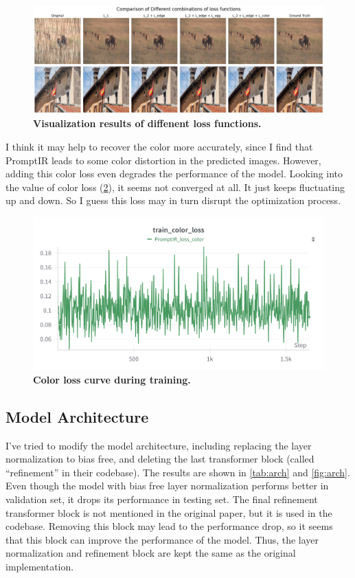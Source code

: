 \documentclass[10pt,twocolumn,letterpaper]{article}
\begin{document}
\begin{figure}[h]
  \centering
  \includegraphics[width=1\linewidth]{assets/exp-loss.png}
  \caption{\textbf{Visualization results of diffenent loss functions.}}
  \label{fig:loss}
\end{figure}

I think it may help to recover the color more accurately, since I find that
PromptIR leads to some color distortion in the predicted images. However, adding
this color loss even degrades the performance of the model. Looking into the
value of color loss (\cref{fig:color-loss}), it seems not converged at all. It
just keeps fluctuating up and down. So I guess this loss may in turn disrupt the
optimization process.

\begin{figure}[h]
  \centering
  \includegraphics[width=1\linewidth]{assets/color-loss.png}
  \caption{\textbf{Color loss curve during training.}}
  \label{fig:color-loss}
\end{figure}


\subsection*{Model Architecture}

I've tried to modify the model architecture, including replacing the layer
normalization to bias free, and deleting the last transformer block (called
``refinement'' in their codebase). The results are shown in \cref{tab:arch}
and \cref{fig:arch}. Even though the model with bias free layer normalization
performs better in validation set, it drops its performance in testing set.
The final refinement transformer block is not mentioned in the original paper,
but it is used in the codebase. Removing this block may lead to the performance
drop, so it seems that this block can improve the performance of the model.
Thus, the layer normalization and refinement block are kept the same as the
original implementation.
\end{document}
